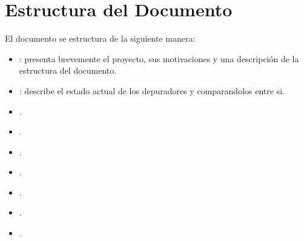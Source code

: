 \section{Estructura del Documento}\label{sec:estructura-documento}
El documento se estructura de la siguiente manera:
\begin{itemize}
  \item {}: presenta brevemente el proyecto, sus motivaciones y una descripción de la estructura del documento.
  \item {}: describe el estado actual de los depuradores y comparandolos entre si.
  \item {}.
  \item {}.
  \item {}.
  \item {}.
  \item {}.
  \item {}.
  \item {}.
\end{itemize}